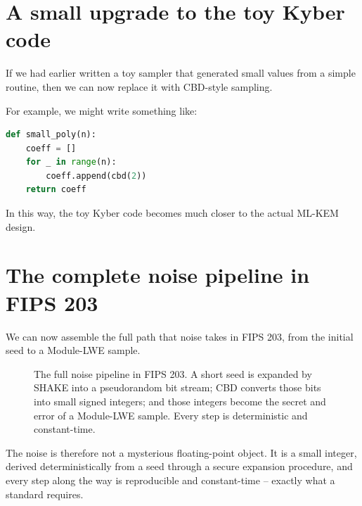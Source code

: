 \section{A small upgrade to the toy Kyber code}

If we had earlier written a toy sampler that generated small values from a simple routine, then we can now replace it with CBD-style sampling.

For example, we might write something like:

\begin{lstlisting}[language=Python]
def small_poly(n):
    coeff = []
    for _ in range(n):
        coeff.append(cbd(2))
    return coeff
\end{lstlisting}

In this way, the toy Kyber code becomes much closer to the actual ML-KEM design.

\section{The complete noise pipeline in FIPS 203}
\label{sec:cbd-pipeline}

We can now assemble the full path that noise takes in FIPS 203, from the initial seed to a Module-LWE sample.

\begin{figure}[H]
\centering
{}
\caption{The full noise pipeline in FIPS 203. A short seed is expanded by SHAKE into a pseudorandom bit stream; CBD converts those bits into small signed integers; and those integers become the secret and error of a Module-LWE sample. Every step is deterministic and constant-time.}
\label{fig:cbd-pipeline}
\end{figure}

The noise is therefore not a mysterious floating-point object. It is a small integer, derived deterministically from a seed through a secure expansion procedure, and every step along the way is reproducible and constant-time -- exactly what a standard requires.


